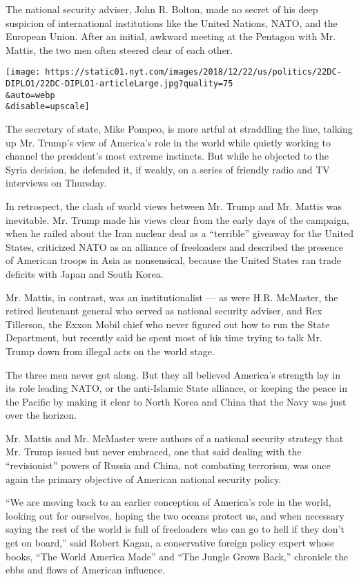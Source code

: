 The national security adviser, John R. Bolton, made no secret of his
deep suspicion of international institutions like the United Nations,
NATO, and the European Union. After an initial, awkward meeting at the
Pentagon with Mr. Mattis, the two men often steered clear of each other.

\texttt{[image: https://static01.nyt.com/images/2018/12/22/us/politics/22DC-DIPLO1/22DC-DIPLO1-articleLarge.jpg?quality=75\\\&auto=webp\\\&disable=upscale]}

The secretary of state, Mike Pompeo, is more artful at straddling the
line, talking up Mr. Trump's view of America's role in the world while
quietly working to channel the president's most extreme instincts. But
while he objected to the Syria decision, he defended it, if weakly, on a
series of friendly radio and TV interviews on Thursday.

In retrospect, the clash of world views between Mr. Trump and Mr. Mattis
was inevitable. Mr. Trump made his views clear from the early days of
the campaign, when he railed about the Iran nuclear deal as a
``terrible'' giveaway for the United States, criticized NATO as an
alliance of freeloaders and described the presence of American troops in
Asia as nonsensical, because the United States ran trade deficits with
Japan and South Korea.

Mr. Mattis, in contrast, was an institutionalist --- as were H.R.
McMaster, the retired lieutenant general who served as national security
adviser, and Rex Tillerson, the Exxon Mobil chief who never figured out
how to run the State Department, but recently said he spent most of his
time trying to talk Mr. Trump down from illegal acts on the world stage.

The three men never got along. But they all believed America's strength
lay in its role leading NATO, or the anti-Islamic State alliance, or
keeping the peace in the Pacific by making it clear to North Korea and
China that the Navy was just over the horizon.

Mr. Mattis and Mr. McMaster were authors of a national security strategy
that Mr. Trump issued but never embraced, one that said dealing with the
``revisionist'' powers of Russia and China, not combating terrorism, was
once again the primary objective of American national security policy.

``We are moving back to an earlier conception of America's role in the
world, looking out for ourselves, hoping the two oceans protect us, and
when necessary saying the rest of the world is full of freeloaders who
can go to hell if they don't get on board,'' said Robert Kagan, a
conservative foreign policy expert whose books, ``The World America
Made'' and ``The Jungle Grows Back,'' chronicle the ebbs and flows of
American influence.

